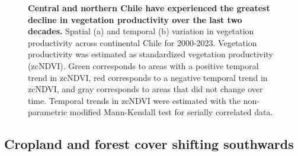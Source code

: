 \documentclass[
  sn-nature,
  numbered]{sn-jnl}
\begin{document}
\begin{figure}[!ht]


\caption{\label{fig-zcNDVI_var}\textbf{Central and northern Chile have
experienced the greatest decline in vegetation productivity over the
last two decades.} Spatial (a) and temporal (b) variation in vegetation
productivity across continental Chile for 2000-2023. Vegetation
productivity was estimated as standardized vegetation productivity
(zcNDVI). Green corresponds to areas with a positive temporal trend in
zcNDVI, red corresponds to a negative temporal trend in zcNDVI, and gray
corresponds to areas that did not change over time. Temporal trends in
zcNDVI were estimated with the non-parametric modified Mann-Kendall test
for serially correlated data.}

\end{figure}%

\subsection{Cropland and forest cover shifting
southwards}\label{cropland-and-forest-cover-shifting-southwards}
\end{document}
